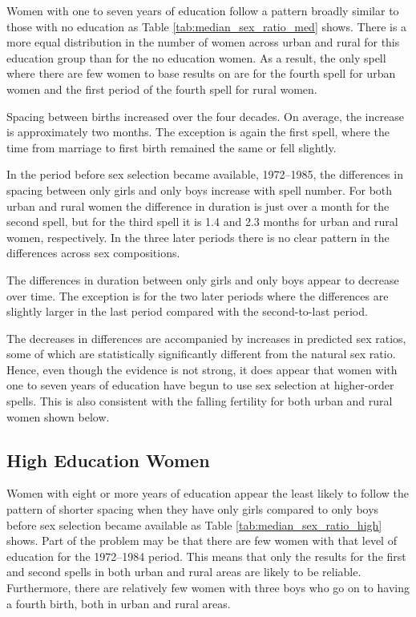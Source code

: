 \documentclass[12pt,letterpaper]{article}
\begin{document}


Women with one to seven years of education follow a pattern
broadly similar to those with no education as 
Table \ref{tab:median_sex_ratio_med} shows.
There is a more equal distribution in the number of women
across urban and rural for this education group than for the
no education women.
As a result, the only spell where there are few women to base 
results on are for the fourth spell for urban women and the first 
period of the fourth spell for rural women.

Spacing between births increased over the four decades.
On average, the increase is approximately two months.
The exception is again the first spell, where the time from
marriage to first birth remained the same or fell slightly.

In the period before sex selection became available, 1972--1985,
the differences in spacing between only girls and only boys
increase with spell number.
For both urban and rural women the difference in duration
is just over a month for the second spell, but for the
third spell it is 1.4 and 2.3 months for urban and rural
women, respectively.
In the three later periods there is no clear pattern
in the differences across sex compositions.

The differences in duration between only girls and only boys 
appear to decrease over time.
The exception is for the two later periods where the
differences are slightly larger in the last period compared
with the second-to-last period. 

The decreases in differences are accompanied by increases
in predicted sex ratios, some of which are statistically 
significantly different from the natural sex ratio.
Hence, even though the evidence is not strong, it does
appear that women with one to seven years of education 
have begun to use sex selection at higher-order spells.
This is also consistent with the falling fertility for both
urban and rural women shown below.

\subsection{High Education Women}



Women with eight or more years of education appear the least likely
to follow the pattern of shorter spacing when they have only girls
compared to only boys before sex selection became available as 
Table \ref{tab:median_sex_ratio_high} shows.
Part of the problem may be that there are few women with that level
of education for the 1972--1984 period.
This means that only the results for the first and second spells in 
both urban and rural areas are likely to be reliable.
Furthermore, there are relatively few women with three boys who
go on to having a fourth birth, both in urban and rural areas.
\end{document}
